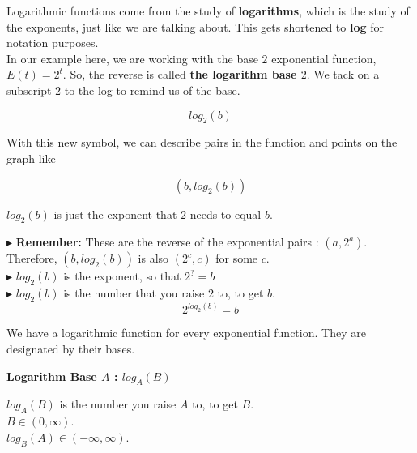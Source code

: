 \documentclass{ximera}
\begin{document}
Logarithmic functions come from the study of \textbf{logarithms}, which is the study of the exponents, just like we are talking about. This gets shortened to \textbf{log} for notation purposes.  \\



In our example here, we are working with the base $2$ exponential function, $E(t) = 2^t$. So, the reverse is called \textbf{the logarithm base $2$}.  We tack on a subscript $2$ to the log to remind us of the base.



\[   log_2(b)     \]


With this new symbol, we can describe pairs in the function and points on the graph like 


\[
(b, log_2(b))
\]


$log_2(b)$ is just the exponent that $2$ needs to equal $b$.





$\blacktriangleright$ \textbf{Remember:} These are the reverse of the exponential pairs : $(a, 2^a)$.  Therefore, $(b, log_2(b))$ is also $(2^c, c)$ for some $c$. \\

$\blacktriangleright$  $log_2(b)$ is the exponent, so that $2^? = b$ \\


$\blacktriangleright$  $log_2(b)$ is the number that you raise $2$ to, to get $b$.  \\

\[   2^{log_2(b)} = b     \]

We have a logarithmic function for every exponential function.  They are designated by their bases.
















\begin{definition} \textbf{\textcolor{green!50!black}{Logarithm Base $A$ : $log_A(B)$}}


$log_A(B)$ is the number you raise $A$ to, to get $B$. \\

$B \in (0, \infty)$. \\

$log_B(A) \in (-\infty, \infty)$.


\end{definition}
\end{document}
